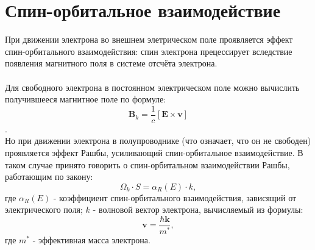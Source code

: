 \documentclass[12pt,oneside]{book}
\begin{document}
{\section{Спин-орбитальное взаимодействие}
	{При движении электрона во внешнем элетрическом поле проявляется эффект спин-орбитального взаимодействия:
	спин электрона прецессирует вследствие появления магнитного поля в системе отсчёта электрона.\\
	\\
	Для свободного электрона в постоянном электрическом поле можно вычислить получившееся магнитное поле по формуле:
	\[{{\bm{B}}_k} = \frac{1}{c}[\bm{E} \times \bm{v}]\] .
	\\
	Но при движении электрона в полупроводнике (что означает, что он не свободен) проявляется эффект Рашбы, усиливающий спин-орбитальное взаимодействие. В таком случае принято говорить о спин-орбитальном взаимодействии Рашбы, работающим по закону:
	\begin{equation}
		\label{OmegaR}
		{\Omega_k}\cdot{S} = {\alpha_R(E)}\cdot{k} ,
	\end{equation}
	где ${\alpha_R(E)}$ - коэффициент спин-орбитального взаимодействия, зависящий от электрического поля;
	${k}$ - волновой вектор электрона, вычисляемый из формулы:
	\begin{equation}
		\label{k}
		\bm{v} = \frac{{\hbar \bm{k}}}{m^*} ,
	\end{equation}
	где ${m^*}$ - эффективная масса электрона.
	

}}
\end{document}
